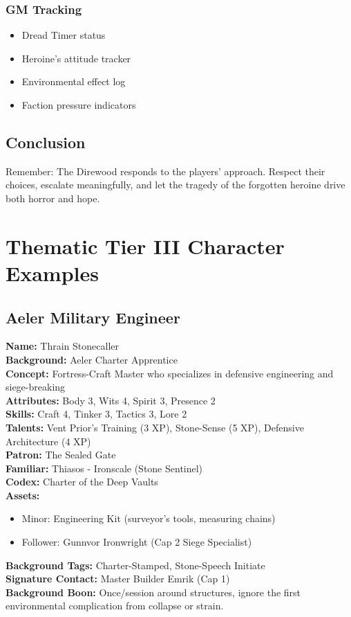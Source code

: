 \documentclass[11pt]{article}
\begin{document}
\subsection{GM Tracking}
\begin{itemize}
    \item Dread Timer status
    \item Heroine's attitude tracker
    \item Environmental effect log
    \item Faction pressure indicators
\end{itemize}

\section{Conclusion}
Remember: The Direwood responds to the players' approach. Respect their choices, escalate meaningfully, and let the tragedy of the forgotten heroine drive both horror and hope.

\chapter{Thematic Tier III Character Examples}

\section{Aeler Military Engineer}
\textbf{Name:} Thrain Stonecaller \\
\textbf{Background:} Aeler Charter Apprentice \\
\textbf{Concept:} Fortress-Craft Master who specializes in defensive engineering and siege-breaking \\
\textbf{Attributes:} Body 3, Wits 4, Spirit 3, Presence 2 \\
\textbf{Skills:} Craft 4, Tinker 3, Tactics 3, Lore 2 \\
\textbf{Talents:} Vent Prior's Training (3 XP), Stone-Sense (5 XP), Defensive Architecture (4 XP) \\
\textbf{Patron:} The Sealed Gate \\
\textbf{Familiar:} Thiasos - Ironscale (Stone Sentinel) \\
\textbf{Codex:} Charter of the Deep Vaults \\
\textbf{Assets:} 
\begin{itemize}
    \item Minor: Engineering Kit (surveyor's tools, measuring chains)
    \item Follower: Gunnvor Ironwright (Cap 2 Siege Specialist)
\end{itemize}
\textbf{Background Tags:} Charter-Stamped, Stone-Speech Initiate \\
\textbf{Signature Contact:} Master Builder Emrik (Cap 1) \\
\textbf{Background Boon:} Once/session around structures, ignore the first environmental complication from collapse or strain.
\end{document}
